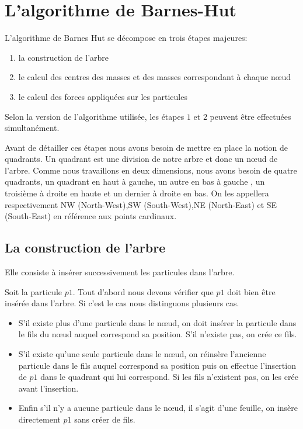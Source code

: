 \section{L'algorithme de Barnes-Hut}
L'algorithme de Barnes Hut se décompose en trois étapes majeures:

\begin{enumerate}
\item la construction de l'arbre

\item le calcul des centres des masses et des masses correspondant à chaque nœud

\item le calcul des forces appliquées sur les particules
\end{enumerate}

Selon la version de l'algorithme utilisée, les étapes $1$ et $2$ peuvent être effectuées simultanément. 

Avant de détailler ces étapes nous avons besoin de mettre en place la notion de quadrants. Un quadrant est une division de notre arbre et donc un nœud de l'arbre. Comme nous travaillons en deux dimensions, nous avons besoin de quatre quadrants, un quadrant en haut à gauche, un autre en bas à gauche , un troisième à droite en haute et un dernier à droite en bas. On les appellera respectivement NW (North-West),SW (South-West),NE (North-East) et SE (South-East) en référence aux points cardinaux.

\subsection{La construction de l'arbre}

Elle consiste à insérer successivement les particules dans l'arbre.

Soit la particule $p1$. Tout d'abord nous devons vérifier que $p1$ doit bien être insérée dans l'arbre.
Si c'est le cas nous distinguons plusieurs cas. 
\begin{itemize}

\item S'il existe plus d'une particule dans le nœud, on doit insérer la particule dans le fils du nœud auquel correspond sa position. S'il n'existe pas, on crée ce fils.


\item S'il existe qu'une seule particule dans le nœud, on réinsère l'ancienne particule dans le fils auquel correspond sa position puis on effectue l'insertion de $p1$ dans le quadrant qui lui correspond. Si les fils n'existent pas, on les crée avant l'insertion. 

\item Enfin s'il n'y a aucune particule dans le nœud, il s'agit  d'une feuille, on insère directement $p1$ sans créer de fils.

\end{itemize}

